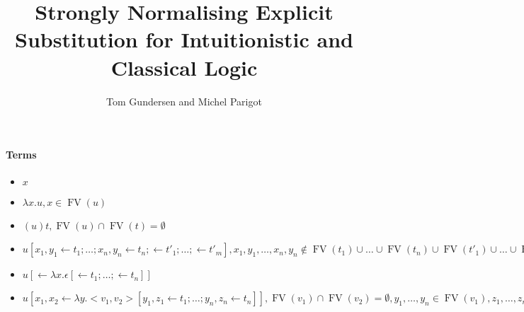 \documentclass[a4paper]{article}
\begin{document}
\title{Strongly Normalising Explicit Substitution for Intuitionistic and Classical Logic}

\author{Tom Gundersen and Michel Parigot}

\maketitle
% 
% 
% 

\newcommand{\FV}{\mathop{FV}}

\paragraph{Terms}
\begin{itemize}
 \item $x$
 \item $\lambda x.u, x\in\FV(u)$
 \item $(u)t, \FV(u)\cap\FV(t)=\emptyset$
 \item $u[x_1,y_1\leftarrow t_1;\dots;x_n,y_n\leftarrow t_n;\leftarrow t'_1;\dots;\leftarrow t'_m], x_1,y_1,\dots,x_n,y_n\not\in\FV(t_1)\cup\dots\cup\FV(t_n)\cup\FV(t'_1)\cup\dots\cup\FV(t'_m), x_1,y_1,\dots,x_n,y_n\in\FV(u), \FV(u)\cap(\FV(t_1)\cup\dots\cup\FV(t_n)\cup\FV(t'_1)\cup\dots\cup\FV(t'_m))=\emptyset$
 \item $u[\leftarrow \lambda x.\epsilon[\leftarrow t_1;\dots;\leftarrow t_n]]$
 \item $u[x_1,x_2\leftarrow \lambda y.<v_1,v_2>[y_1,z_1\leftarrow t_1;\dots;y_n,z_n\leftarrow t_n]], \FV(v_1)\cap\FV(v_2)=\emptyset, y_1,\dots,y_n\in\FV(v_1),z_1,\dots,z_n\in\FV(v_2)$
\end{itemize}
\end{document}
